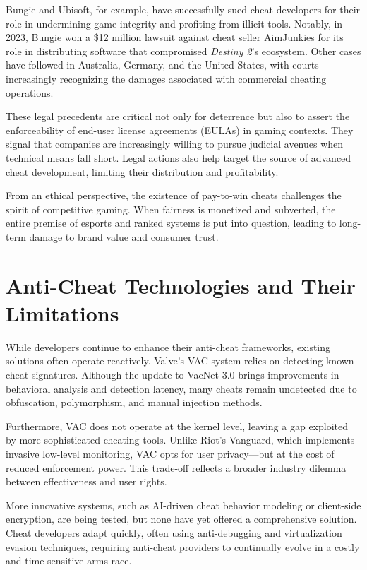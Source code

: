 Bungie and Ubisoft, for example, have successfully sued cheat developers for their role in undermining game integrity and profiting from illicit tools. Notably, in 2023, Bungie won a \$12 million lawsuit against cheat seller AimJunkies for its role in distributing software that compromised \textit{Destiny 2}'s ecosystem. Other cases have followed in Australia, Germany, and the United States, with courts increasingly recognizing the damages associated with commercial cheating operations.

These legal precedents are critical not only for deterrence but also to assert the enforceability of end-user license agreements (EULAs) in gaming contexts. They signal that companies are increasingly willing to pursue judicial avenues when technical means fall short. Legal actions also help target the source of advanced cheat development, limiting their distribution and profitability.

From an ethical perspective, the existence of pay-to-win cheats challenges the spirit of competitive gaming. When fairness is monetized and subverted, the entire premise of esports and ranked systems is put into question, leading to long-term damage to brand value and consumer trust.

\section{Anti-Cheat Technologies and Their Limitations}

While developers continue to enhance their anti-cheat frameworks, existing solutions often operate reactively. Valve’s VAC system relies on detecting known cheat signatures. Although the update to VacNet 3.0 brings improvements in behavioral analysis and detection latency, many cheats remain undetected due to obfuscation, polymorphism, and manual injection methods.

Furthermore, VAC does not operate at the kernel level, leaving a gap exploited by more sophisticated cheating tools. Unlike Riot’s Vanguard, which implements invasive low-level monitoring, VAC opts for user privacy—but at the cost of reduced enforcement power. This trade-off reflects a broader industry dilemma between effectiveness and user rights.

More innovative systems, such as AI-driven cheat behavior modeling or client-side encryption, are being tested, but none have yet offered a comprehensive solution. Cheat developers adapt quickly, often using anti-debugging and virtualization evasion techniques, requiring anti-cheat providers to continually evolve in a costly and time-sensitive arms race.


